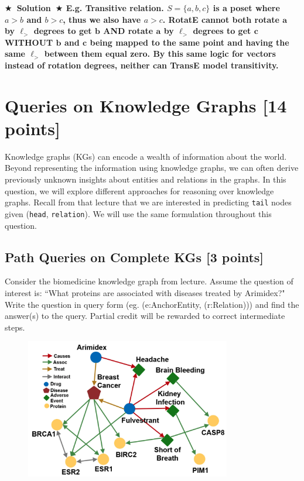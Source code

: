 \documentclass[11pt]{article}
\numberwithin{figure}{section}
\newcommand{\Solution}[1]{{\medskip \color{red} \bf $\bigstar$~\sf \textbf{Solution}~$\bigstar$ \sf #1 } \bigskip}
\begin{document}
\Solution{E.g. Transitive relation. $S=\{a, b, c\}$ is a poset where $a>b$ and $b>c$, thus we also have $a>c$. 
RotatE cannot both rotate $\mathbf{a}$ by $\ell_>$ degrees to get $\mathbf{b}$ AND rotate $\mathbf{a}$ by $\ell_>$ degrees to get $\mathbf{c}$ 
WITHOUT $\mathbf{b}$ and $\mathbf{c}$ being mapped to the same point and having the same $\ell_>$ between them equal zero. By this same logic for vectors instead of rotation degrees, neither can TransE model transitivity.}

\newpage

\section{Queries on Knowledge Graphs [14 points]}

Knowledge graphs (KGs) can encode a wealth of information about the world. Beyond representing the information using knowledge graphs, we can often derive previously unknown insights about entities and relations in the graphs. In this question, we will explore different approaches for reasoning over knowledge graphs. Recall from that lecture that we are interested in predicting \texttt{tail} nodes given (\texttt{head}, \texttt{relation}). We will use the same formulation throughout this question.


\subsection{Path Queries on Complete KGs [3 points]}
Consider the biomedicine knowledge graph from lecture. Assume the question of interest is: ``What proteins are associated with diseases treated by Arimidex?" Write the question in query form (eg. (e:AnchorEntity, (r:Relation))) and find the answer(s) to the query. Partial credit will be rewarded to correct intermediate steps.

\begin{figure}[H]
    \centering
    \includegraphics[width=0.8\textwidth]{CS224W_Homework2/5.1.png}
    \label{fig:5.1}
\end{figure}
\end{document}
